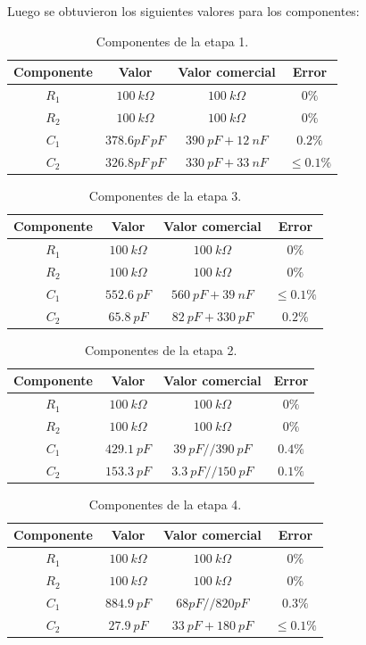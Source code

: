 Luego se obtuvieron los siguientes valores para los componentes:
\begin{multicols}{2}
\begin{table}[H]
\centering
\begin{tabular}{cccc}
\hline
Componente & Valor & Valor comercial & Error \\ \hline
$R_1$ & $100 \ k\Omega$ & $100 \ k\Omega$ & $0\%$ \\
$R_2$ & $100 \ k\Omega$ & $100 \ k\Omega$ & $0\%$\\
$C_1$ & $378.6pF \ pF$ & $390 \ pF + 12 \ nF$ & $0.2\%$ \\
$C_2$ & $326.8pF \ pF$ & $330 \ pF + 33 \ nF$ & $\le0.1\%$ \\ \hline
\end{tabular}
\caption{Componentes de la etapa 1.}
\end{table}

\begin{table}[H]
\centering
\begin{tabular}{cccc}
\hline
Componente & Valor & Valor comercial & Error \\ \hline
$R_1$ & $100 \ k\Omega$ & $100 \ k\Omega$ & $0\%$ \\
$R_2$ & $100 \ k\Omega$ & $100 \ k\Omega$ & $0\%$\\
$C_1$ & $552.6 \ pF$ & $560 \ pF + 39 \ nF$ & $\le0.1\%$ \\
$C_2$ & $65.8 \ pF$ & $82 \ pF + 330 \ pF$ & $0.2\%$ \\ \hline
\end{tabular}
\caption{Componentes de la etapa 3.}
\end{table}
\begin{table}[H]
\centering
\begin{tabular}{cccc}
\hline
Componente & Valor & Valor comercial & Error \\ \hline
$R_1$ & $100 \ k\Omega$ & $100 \ k\Omega$ & $0\%$ \\
$R_2$ & $100 \ k\Omega$ & $100 \ k\Omega$ & $0\%$\\
$C_1$ & $429.1 \ pF$ & $39 \ pF // 390 \ pF$ & $0.4\%$ \\
$C_2$ & $153.3 \ pF$ & $3.3 \ pF // 150 \ pF$ & $0.1\%$ \\ \hline
\end{tabular}
\caption{Componentes de la etapa 2.}
\end{table}
\begin{table}[H]
\centering
\begin{tabular}{cccc}
\hline
Componente & Valor & Valor comercial & Error \\ \hline
$R_1$ & $100 \ k\Omega$ & $100 \ k\Omega$ & $0\%$ \\
$R_2$ & $100 \ k\Omega$ & $100 \ k\Omega$ & $0\%$\\
$C_1$ & $884.9 \ pF$ & $68pF // 820pF $ & $0.3\%$ \\
$C_2$ & $27.9 \ pF$ & $33 \ pF + 180 \ pF$ & $\le0.1\%$ \\ \hline
\end{tabular}
\caption{Componentes de la etapa 4.}
\end{table}
\end{multicols}
